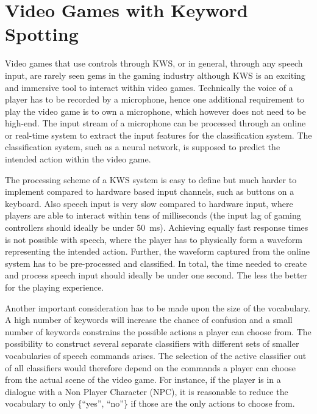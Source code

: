 
\section{Video Games with Keyword Spotting}\label{sec:intro_games}
Video games that use controls through KWS, or in general, through any speech input, are rarely seen gems in the gaming industry although KWS is an exciting and immersive tool to interact within video games.
Technically the voice of a player has to be recorded by a microphone, hence one additional requirement to play the video game is to own a microphone, which however does not need to be high-end.
The input stream of a microphone can be processed through an online or real-time system to extract the input features for the classification system.
The classification system, such as a neural network, is supposed to predict the intended action within the video game.

The processing scheme of a KWS system is easy to define but much harder to implement compared to hardware based input channels, such as buttons on a keyboard.
Also speech input is very slow compared to hardware input, where players are able to interact within tens of milliseconds (the input lag of gaming controllers should ideally be under \SI{50}{\milli\second}).
Achieving equally fast response times is not possible with speech, where the player has to physically form a waveform representing the intended action.
Further, the waveform captured from the online system has to be pre-processed and classified.
In total, the time needed to create and process speech input should ideally be under one second. 
The less the better for the playing experience.

Another important consideration has to be made upon the size of the vocabulary.
A high number of keywords will increase the chance of confusion and a small number of keywords constrains the possible actions a player can choose from.
The possibility to construct several separate classifiers with different sets of smaller vocabularies of speech commands arises.
The selection of the active classifier out of all classifiers would therefore depend on the commands a player can choose from the actual scene of the video game.
For instance, if the player is in a dialogue with a Non Player Character (NPC), it is reasonable to reduce the vocabulary to only \{\enquote{yes}, \enquote{no}\} if those are the only actions to choose from.

